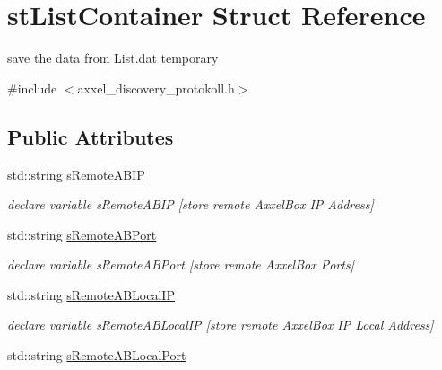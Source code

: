 \hypertarget{structstListContainer}{\section{st\-List\-Container Struct Reference}
\label{structstListContainer}
}


save the data from List.\-dat temporary  




{\ttfamily \#include $<$axxel\-\_\-discovery\-\_\-protokoll.\-h$>$}

\subsection*{Public Attributes}
\begin{DoxyCompactItemize}
\item 
\hypertarget{structstListContainer_a2d926770549c1af0e1282f20cdc241e5}{std\-::string \hyperlink{structstListContainer_a2d926770549c1af0e1282f20cdc241e5}{s\-Remote\-A\-B\-I\-P}}\label{structstListContainer_a2d926770549c1af0e1282f20cdc241e5}

\begin{DoxyCompactList}\small\item\em declare variable s\-Remote\-A\-B\-I\-P \mbox{[}store remote Axxel\-Box I\-P Address\mbox{]} \end{DoxyCompactList}\item 
\hypertarget{structstListContainer_ad2a9d2c715866e4fe3a2c588ab3105f0}{std\-::string \hyperlink{structstListContainer_ad2a9d2c715866e4fe3a2c588ab3105f0}{s\-Remote\-A\-B\-Port}}\label{structstListContainer_ad2a9d2c715866e4fe3a2c588ab3105f0}

\begin{DoxyCompactList}\small\item\em declare variable s\-Remote\-A\-B\-Port \mbox{[}store remote Axxel\-Box Ports\mbox{]} \end{DoxyCompactList}\item 
\hypertarget{structstListContainer_a661224bc268bac73ea4c4f179626f04b}{std\-::string \hyperlink{structstListContainer_a661224bc268bac73ea4c4f179626f04b}{s\-Remote\-A\-B\-Local\-I\-P}}\label{structstListContainer_a661224bc268bac73ea4c4f179626f04b}

\begin{DoxyCompactList}\small\item\em declare variable s\-Remote\-A\-B\-Local\-I\-P \mbox{[}store remote Axxel\-Box I\-P Local Address\mbox{]} \end{DoxyCompactList}\item 
\hypertarget{structstListContainer_aeadf64994288c18847cb1b9fc244922f}{std\-::string \hyperlink{structstListContainer_aeadf64994288c18847cb1b9fc244922f}{s\-Remote\-A\-B\-Local\-Port}}\label{structstListContainer_aeadf64994288c18847cb1b9fc244922f}


\end{DoxyCompactItemize}
